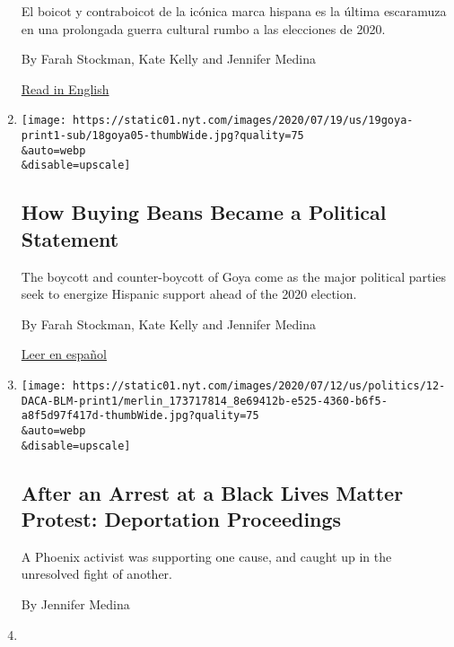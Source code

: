 \begin{enumerate}
  El boicot y contraboicot de la icónica marca hispana es la última
  escaramuza en una prolongada guerra cultural rumbo a las elecciones de
  2020.

  By Farah Stockman, Kate Kelly and Jennifer Medina

  \href{https://www.nytimes.com/2020/07/19/us/goya-trump-hispanic-vote.html}{Read
  in English}
\item
  \href{/2020/07/19/us/goya-trump-hispanic-vote.html}{}

  \texttt{[image: https://static01.nyt.com/images/2020/07/19/us/19goya-print1-sub/18goya05-thumbWide.jpg?quality=75\\\&auto=webp\\\&disable=upscale]}

  \hypertarget{how-buying-beans-became-a-political-statement}{%
  \subsection{How Buying Beans Became a Political
  Statement}\label{how-buying-beans-became-a-political-statement}}

  The boycott and counter-boycott of Goya come as the major political
  parties seek to energize Hispanic support ahead of the 2020 election.

  By Farah Stockman, Kate Kelly and Jennifer Medina

  \href{https://www.nytimes.com/es/2020/07/19/espanol/goya-boicot-trump.html}{Leer
  en español}
\item
  \href{/2020/07/11/us/politics/black-lives-matter-phoenix-daca.html}{}

  \texttt{[image: https://static01.nyt.com/images/2020/07/12/us/politics/12-DACA-BLM-print1/merlin\_173717814\_8e69412b-e525-4360-b6f5-a8f5d97f417d-thumbWide.jpg?quality=75\\\&auto=webp\\\&disable=upscale]}

  \hypertarget{after-an-arrest-at-a-black-lives-matter-protest-deportation-proceedings}{%
  \subsection{After an Arrest at a Black Lives Matter Protest:
  Deportation
  Proceedings}\label{after-an-arrest-at-a-black-lives-matter-protest-deportation-proceedings}}

  A Phoenix activist was supporting one cause, and caught up in the
  unresolved fight of another.

  By Jennifer Medina
\item
  \href{/es/2020/07/03/espanol/latinos-racismo.html}{}


\end{enumerate}
